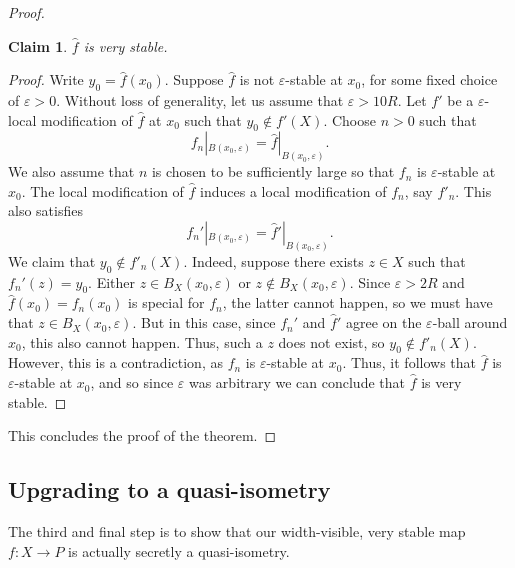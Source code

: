 \documentclass[11pt,a4paper]{amsart}
\newtheorem{claim}[theorem]{Claim}
\theoremstyle{definition}
\begin{document}
\begin{proof}
    \begin{claim}
         $\widehat f$ is very stable.
    \end{claim}

    \begin{proof}
        Write $y_0 = \widehat f(x_0)$. 
        Suppose $\widehat f$ is not $\varepsilon$-stable at $x_0$, for some fixed choice of $\varepsilon > 0$. Without loss of generality, let us assume that $\varepsilon > 10R$. Let $f'$ be a $\varepsilon$-local modification of $\widehat f$ at $x_0$ such that $y_0 \not \in f'(X)$. 
        Choose $n > 0$ such that 
        $$
        f_n|_{B(x_0,\varepsilon)} = \widehat f|_{B(x_0,\varepsilon)}.
        $$
        We also assume that $n$ is chosen to be sufficiently large so that $f_n$ is $\varepsilon$-stable at $x_0$.
        The local modification of $\widehat f$ induces a local modification of $f_n$, say $f'_n$. This also satisfies
        $$
        f_n'|_{B(x_0,\varepsilon)} = \widehat f'|_{B(x_0,\varepsilon)}.
        $$
        We claim that $ y_0 \not \in f'_n(X)$.
		Indeed, suppose there exists $z \in X$ such that $f_n'(z) = y_0$. Either $z \in B_X(x_0,\varepsilon)$ or $z \not \in B_X(x_0,\varepsilon)$. Since $\varepsilon > 2R$ and $\widehat f(x_0)=f_n(x_0)$ is special for $f_n$, the latter cannot happen, so we must have that $z \in B_X(x_0,\varepsilon)$. But in this case, since $f_n'$ and $\widehat f'$ agree on the $\varepsilon$-ball around $x_0$, this also cannot happen. Thus, such a $z$ does not exist, so $ y_0 \not \in f'_n(X)$.
        However, this is a contradiction, as $f_n$ is $\varepsilon$-stable at $x_0$. Thus, it follows that $\widehat f$ is $\varepsilon$-stable at $x_0$, and so since $\varepsilon$ was arbitrary we can conclude that $\widehat f$ is very stable. 
    \end{proof}

    This concludes the proof of the theorem.
\end{proof}


\subsection{Upgrading to a quasi-isometry}\label{sec:upgrade-to-qi}

The third and final step is to show that our width-visible, very stable map $f : X \to P$ is actually secretly a quasi-isometry.
\end{document}
